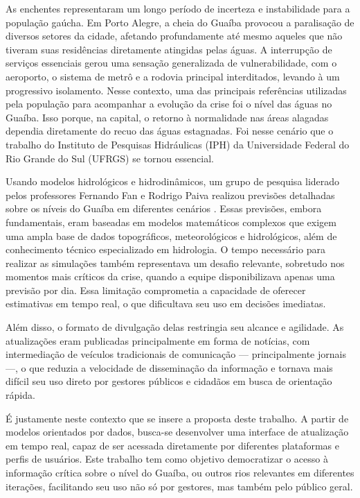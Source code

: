 As enchentes representaram um longo período de incerteza e instabilidade para a população gaúcha. Em Porto Alegre, a
cheia do Guaíba provocou a paralisação de diversos setores da cidade, afetando profundamente até mesmo aqueles que não
tiveram suas residências diretamente atingidas pelas águas. A interrupção de serviços essenciais gerou uma sensação
generalizada de vulnerabilidade, com o aeroporto, o sistema de metrô e a rodovia principal interditados, levando à um
progressivo isolamento. Nesse contexto, uma das principais referências utilizadas pela população para acompanhar a
evolução da crise foi o nível das águas no Guaíba. Isso porque, na capital, o retorno à normalidade nas áreas alagadas
dependia diretamente do recuo das águas estagnadas. Foi nesse cenário que o trabalho do Instituto de Pesquisas
Hidráulicas (IPH) da Universidade Federal do Rio Grande do Sul (UFRGS) se tornou essencial.

Usando modelos hidrológicos e hidrodinâmicos, um grupo de pesquisa liderado pelos professores Fernando Fan e Rodrigo
Paiva realizou previsões detalhadas sobre os níveis do Guaíba em diferentes cenários \cite{iph}. Essas previsões, embora
fundamentais, eram baseadas em modelos matemáticos complexos que exigem uma ampla base de dados topográficos,
meteorológicos e hidrológicos, além de conhecimento técnico especializado em hidrologia. O tempo necessário para
realizar as simulações também representava um desafio relevante, sobretudo nos momentos mais críticos da crise, quando a
equipe disponibilizava apenas uma previsão por dia. Essa limitação comprometia a capacidade de oferecer estimativas em
tempo real, o que dificultava seu uso em decisões imediatas.

Além disso, o formato de divulgação delas restringia seu alcance e agilidade. As atualizações eram publicadas
principalmente em forma de notícias, com intermediação de veículos tradicionais de comunicação — principalmente jornais
—, o que reduzia a velocidade de disseminação da informação e tornava mais difícil seu uso direto por gestores públicos
e cidadãos em busca de orientação rápida.

É justamente neste contexto que se insere a proposta deste trabalho. A partir de modelos orientados por dados, busca-se
desenvolver uma interface de atualização em tempo real, capaz de ser acessada diretamente por diferentes plataformas e
perfis de usuários. Este trabalho tem como objetivo democratizar o acesso à informação crítica sobre o nível do Guaíba,
ou outros rios relevantes em diferentes iterações, facilitando seu uso não só por gestores, mas também pelo público
geral. 